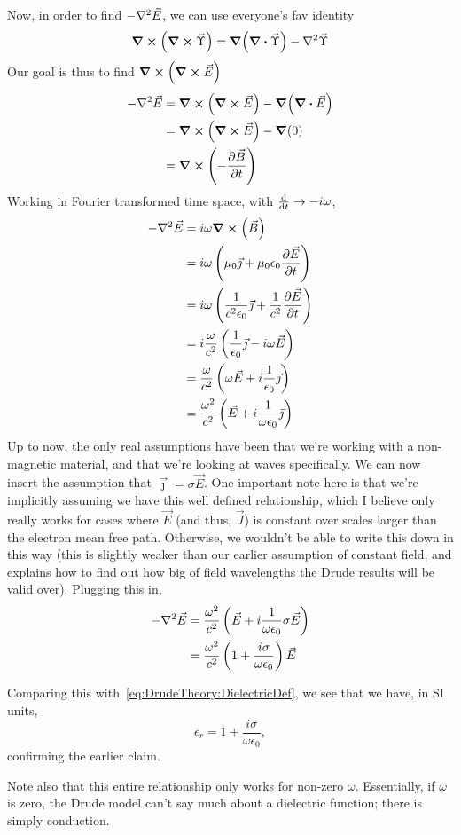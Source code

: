 \documentclass[../main.tex]{subfiles}
\begin{document}
	Now, in order to find $-\laplacian{\vec{E}}$, we can use everyone's fav identity
	\begin{equation}
		\curl(\curl{\vec{\Upsilon}}) = \grad(\div{\vec{\Upsilon}}) - \laplacian{\vec{\Upsilon}}
	\end{equation}
	Our goal is thus to find $\curl(\curl{\vec{E}})$
	\begin{align}
		- \laplacian{\vec{E}} &= \curl(\curl{\vec{E}}) - \grad(\div{\vec{E}}) \\
		&= \curl(\curl{\vec{E}}) - \grad(0) \\
		&= \curl(- \pdv{\vec{B}}{t})
	\end{align}
	Working in Fourier transformed time space, with $\dv{}{t} \rightarrow -i \omega$,
	\begin{align}
		- \laplacian{\vec{E}} &= i\omega \curl(\vec{B}) \\
		&= i \omega \left(\mu_0 \vec{\jmath} + \mu_0 \epsilon_0 \pdv{\vec{E}}{t} \right) \\
		&= i \omega \left(\frac{1}{c^2 \epsilon_0} \vec{\jmath} + \frac{1}{c^2} \pdv{\vec{E}}{t} \right) \\
		&= i \frac{\omega}{c^2} \left(\frac{1}{\epsilon_0} \vec{\jmath} - i\omega \vec{E} \right) \\
		&= \frac{\omega}{c^2} \left(\omega \vec{E} + i \frac{1}{\epsilon_0} \vec{\jmath} \right) \\
		&= \frac{\omega^2}{c^2} \left(\vec{E} + i \frac{1}{\omega \epsilon_0} \vec{\jmath} \right)
	\end{align}
	Up to now, the only real assumptions have been that we're working with a non-magnetic material, and that we're looking at waves specifically.
	We can now insert the assumption that $\vec{\jmath} = \sigma \vec{E}$.
	One important note here is that we're implicitly assuming we have this well defined relationship, which I believe only really works for cases where $\vec{E}$ (and thus, $\vec{J}$) is constant over scales larger than the electron mean free path.
	Otherwise, we wouldn't be able to write this down in this way (this is slightly weaker than our earlier assumption of constant field, and explains how to find out how big of field wavelengths the Drude results will be valid over).
	Plugging this in,
	\begin{align}
		- \laplacian{\vec{E}} &= \frac{\omega^2}{c^2} \left(\vec{E} + i \frac{1}{\omega \epsilon_0} \sigma \vec{E} \right) \\
		&= \frac{\omega^2}{c^2} \left(1+ \frac{i \sigma}{\omega \epsilon_0} \right) \vec{E}
	\end{align}

	Comparing this with~\eqref{eq:DrudeTheory:DielectricDef}, we see that we have, in SI units,
	\begin{equation}
		\epsilon_r = 1 + \frac{i \sigma}{\omega \epsilon_0},
	\end{equation}
	confirming the earlier claim.

	Note also that this entire relationship only works for non-zero $\omega$.
	Essentially, if $\omega$ is zero, the Drude model can't say much about a dielectric function;
	there is simply conduction.
\end{document}
